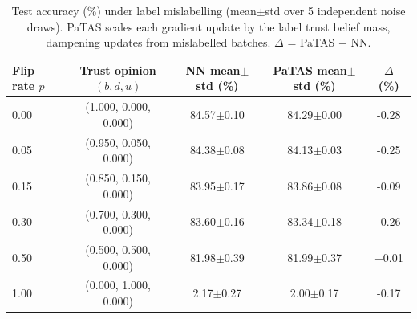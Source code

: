 \begin{table}[ht]
\centering
\caption{Test accuracy (\%) under label mislabelling (mean$\pm$std over 5 independent noise draws). PaTAS scales each gradient update by the label trust belief mass, dampening updates from mislabelled batches. $\Delta$ = PaTAS $-$ NN.}
\label{tab:label-noise}
\begin{tabular}{lcccc}
\toprule
Flip rate $p$ & Trust opinion $(b,d,u)$ & NN mean$\pm$std (\%) & PaTAS mean$\pm$std (\%) & $\Delta$ (\%) \\
\midrule
0.00 & (1.000, 0.000, 0.000) & 84.57$\pm$0.10 & 84.29$\pm$0.00 & -0.28 \\
0.05 & (0.950, 0.050, 0.000) & 84.38$\pm$0.08 & 84.13$\pm$0.03 & -0.25 \\
0.15 & (0.850, 0.150, 0.000) & 83.95$\pm$0.17 & 83.86$\pm$0.08 & -0.09 \\
0.30 & (0.700, 0.300, 0.000) & 83.60$\pm$0.16 & 83.34$\pm$0.18 & -0.26 \\
0.50 & (0.500, 0.500, 0.000) & 81.98$\pm$0.39 & 81.99$\pm$0.37 & +0.01 \\
1.00 & (0.000, 1.000, 0.000) & 2.17$\pm$0.27 & 2.00$\pm$0.17 & -0.17 \\
\bottomrule
\end{tabular}
\end{table}